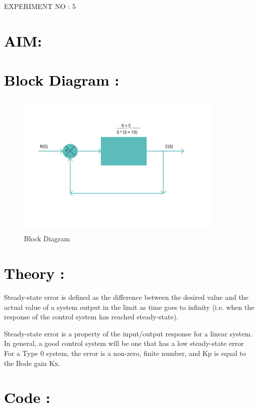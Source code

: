 \documentclass[12pt]{article}
\begin{document}
\begin{center}
    \LARGE {EXPERIMENT NO : 5}
             
\end{center}

\section*{\textcolor{black}{AIM: }}

\section*{\textcolor{black}{Block Diagram :}}
\begin{figure}[!hth]
        \centering
        \includegraphics[width =10cm, height = 7cm]{images/exp5.png}
        \caption{Block Diagram}
        \label{Graph}
\end{figure}
\section*{\textcolor{black}{Theory :}}
Steady-state error is defined as the difference between the desired value and the actual value of a system output in the limit as time goes to infinity (i.e. when the response of the control system has reached steady-state).\par

Steady-state error is a property of the input/output response for a linear system. In general, a good control system will be one that has a low steady-state error
For a Type 0 system, the error is a non-zero, finite number, and Kp is equal to the Bode gain Kx. \par

\section*{\textcolor{black}{Code :}}
\end{document}

